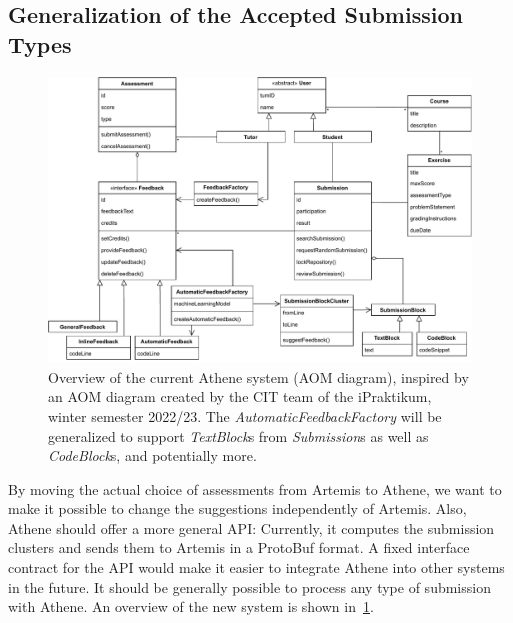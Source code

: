 
\subsection*{Generalization of the Accepted Submission Types}
\begin{figure}[ht]
    \centering
    \includegraphics[width=\linewidth]{figures/proposal/aom.pdf}
    \caption{Overview of the current Athene system (AOM diagram), inspired by an AOM diagram created by the CIT team of the iPraktikum, winter semester 2022/23. The \textit{AutomaticFeedbackFactory} will be generalized to support \textit{TextBlock}s from \textit{Submission}s as well as \textit{CodeBlock}s, and potentially more.}
    \label{fig:aom}
\end{figure}
\noindent By moving the actual choice of assessments from Artemis to Athene, we want to make it possible to change the suggestions independently of Artemis. Also, Athene should offer a more general API: Currently, it computes the submission clusters and sends them to Artemis in a ProtoBuf format. A fixed interface contract for the API would make it easier to integrate Athene into other systems in the future. It should be generally possible to process any type of submission with Athene. An overview of the new system is shown in~\cref{fig:aom}.

